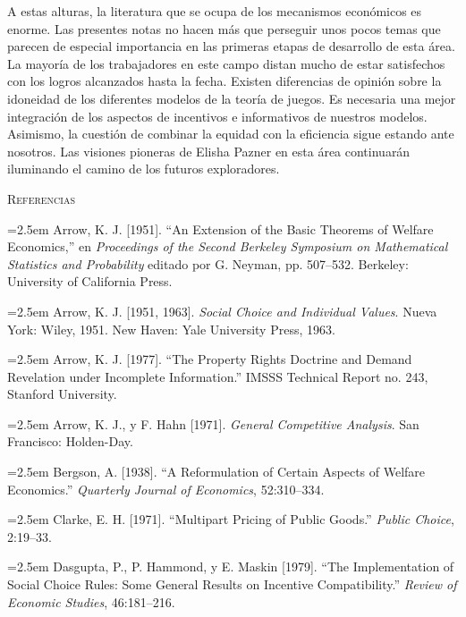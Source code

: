 \documentclass[12pt, letterpaper]{article}
\newcommand{\bibentry}[1]{\noindent\hangindent=2.5em\hangafter=1 \small #1 \par\vspace{0.75em}}
\begin{document}
\medskip

A estas alturas, la literatura que se ocupa de los mecanismos económicos es enorme. Las presentes notas no hacen más que perseguir unos pocos temas que parecen de especial importancia en las primeras etapas de desarrollo de esta área. La mayoría de los trabajadores en este campo distan mucho de estar satisfechos con los logros alcanzados hasta la fecha. Existen diferencias de opinión sobre la idoneidad de los diferentes modelos de la teoría de juegos. Es necesaria una mejor integración de los aspectos de incentivos e informativos de nuestros modelos. Asimismo, la cuestión de combinar la equidad con la eficiencia sigue estando ante nosotros. Las visiones pioneras de Elisha Pazner en esta área continuarán iluminando el camino de los futuros exploradores.

\vspace{1.5cm}

\begin{center}
    {\large\scshape\color{MidnightBlue} Referencias}
    \vspace{0.8cm}
\end{center}

\bibentry{Arrow, K. J. [1951]. ``An Extension of the Basic Theorems of Welfare Economics,'' en \textit{Proceedings of the Second Berkeley Symposium on Mathematical Statistics and Probability} editado por G. Neyman, pp. 507--532. Berkeley: University of California Press.}

\bibentry{Arrow, K. J. [1951, 1963]. \textit{Social Choice and Individual Values}. Nueva York: Wiley, 1951. New Haven: Yale University Press, 1963.}

\bibentry{Arrow, K. J. [1977]. ``The Property Rights Doctrine and Demand Revelation under Incomplete Information.'' IMSSS Technical Report no. 243, Stanford University.}

\bibentry{Arrow, K. J., y F. Hahn [1971]. \textit{General Competitive Analysis}. San Francisco: Holden-Day.}

\bibentry{Bergson, A. [1938]. ``A Reformulation of Certain Aspects of Welfare Economics.'' \textit{Quarterly Journal of Economics}, 52:310--334.}

\bibentry{Clarke, E. H. [1971]. ``Multipart Pricing of Public Goods.'' \textit{Public Choice}, 2:19--33.}

\bibentry{Dasgupta, P., P. Hammond, y E. Maskin [1979]. ``The Implementation of Social Choice Rules: Some General Results on Incentive Compatibility.'' \textit{Review of Economic Studies}, 46:181--216.}
\end{document}
